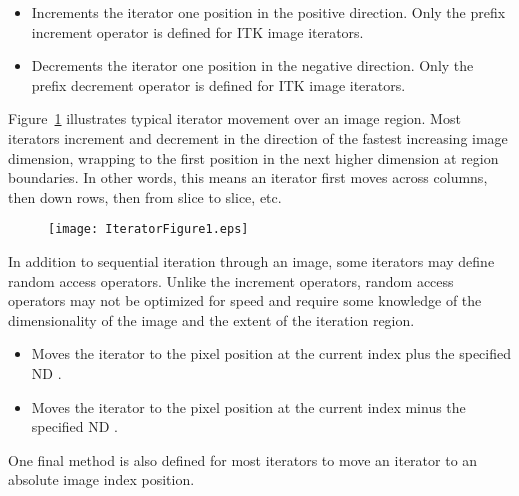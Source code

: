 \begin{itemize}
\item \textbf{} Increments the iterator one position in the
positive direction.  Only the prefix increment operator is defined for ITK image
iterators.

\item \textbf{} Decrements the iterator one position in the
negative direction.  Only the prefix decrement operator is defined for ITK
image iterators. 
\end{itemize}

Figure~\ref{fig:WalkingIterator} illustrates typical iterator movement over
an image region.  Most iterators increment and decrement in the direction of
the fastest increasing image dimension, wrapping to the first position in the
next higher dimension at region boundaries.  In other words, this means an
iterator first moves across columns, then down rows, then from slice to slice,
etc.

\begin{figure}
\centering
\texttt{[image: IteratorFigure1.eps]}
\protect\label{fig:WalkingIterator}
\end{figure}

In addition to sequential iteration through an image, some iterators may define
random access operators.  Unlike the increment operators, random access
operators may not be optimized for speed and require some knowledge of the
dimensionality of the image and the extent of the iteration region.  

\begin{itemize}
\item \textbf{} Moves the iterator to the pixel
position at the current index plus the specified ND . 

\item \textbf{} Moves the iterator to the pixel
position at the current index minus the specified ND .
\end{itemize}

One final method is also defined for most iterators to move an iterator to an
absolute image index position.

